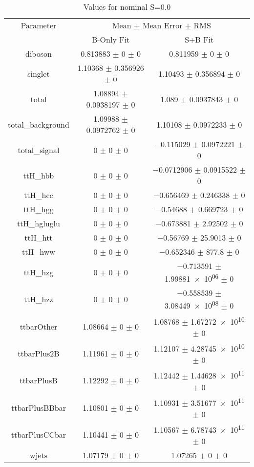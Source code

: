 \begin{table}
\centering
\caption{Values for nominal S=0.0}
\begin{tabular}{ccc}
\toprule
Parameter & \multicolumn{2}{c}{Mean $\pm$ Mean Error $\pm$ RMS}\\
 & B-Only Fit & S+B Fit\\
\midrule
diboson & \num{0.813883} $\pm$ \num{0} $\pm$ \num{0} & \num{0.811959} $\pm$ \num{0} $\pm$ \num{0}\\
singlet & \num{1.10368} $\pm$ \num{0.356926} $\pm$ \num{0} & \num{1.10493} $\pm$ \num{0.356894} $\pm$ \num{0}\\
total & \num{1.08894} $\pm$ \num{0.0938197} $\pm$ \num{0} & \num{1.089} $\pm$ \num{0.0937843} $\pm$ \num{0}\\
total\_background & \num{1.09988} $\pm$ \num{0.0972762} $\pm$ \num{0} & \num{1.10108} $\pm$ \num{0.0972233} $\pm$ \num{0}\\
total\_signal & \num{0} $\pm$ \num{0} $\pm$ \num{0} & \num{-0.115029} $\pm$ \num{0.0972221} $\pm$ \num{0}\\
ttH\_hbb & \num{0} $\pm$ \num{0} $\pm$ \num{0} & \num{-0.0712906} $\pm$ \num{0.0915522} $\pm$ \num{0}\\
ttH\_hcc & \num{0} $\pm$ \num{0} $\pm$ \num{0} & \num{-0.656469} $\pm$ \num{0.246338} $\pm$ \num{0}\\
ttH\_hgg & \num{0} $\pm$ \num{0} $\pm$ \num{0} & \num{-0.54688} $\pm$ \num{0.669723} $\pm$ \num{0}\\
ttH\_hgluglu & \num{0} $\pm$ \num{0} $\pm$ \num{0} & \num{-0.673881} $\pm$ \num{2.92502} $\pm$ \num{0}\\
ttH\_htt & \num{0} $\pm$ \num{0} $\pm$ \num{0} & \num{-0.56769} $\pm$ \num{25.9013} $\pm$ \num{0}\\
ttH\_hww & \num{0} $\pm$ \num{0} $\pm$ \num{0} & \num{-0.652346} $\pm$ \num{877.8} $\pm$ \num{0}\\
ttH\_hzg & \num{0} $\pm$ \num{0} $\pm$ \num{0} & \num{-0.713591} $\pm$ \num{1.99881e+06} $\pm$ \num{0}\\
ttH\_hzz & \num{0} $\pm$ \num{0} $\pm$ \num{0} & \num{-0.558539} $\pm$ \num{3.08449e+08} $\pm$ \num{0}\\
ttbarOther & \num{1.08664} $\pm$ \num{0} $\pm$ \num{0} & \num{1.08768} $\pm$ \num{1.67272e+10} $\pm$ \num{0}\\
ttbarPlus2B & \num{1.11961} $\pm$ \num{0} $\pm$ \num{0} & \num{1.12107} $\pm$ \num{4.28745e+10} $\pm$ \num{0}\\
ttbarPlusB & \num{1.12292} $\pm$ \num{0} $\pm$ \num{0} & \num{1.12442} $\pm$ \num{1.44628e+11} $\pm$ \num{0}\\
ttbarPlusBBbar & \num{1.10801} $\pm$ \num{0} $\pm$ \num{0} & \num{1.10931} $\pm$ \num{3.51677e+11} $\pm$ \num{0}\\
ttbarPlusCCbar & \num{1.10441} $\pm$ \num{0} $\pm$ \num{0} & \num{1.10567} $\pm$ \num{6.78743e+11} $\pm$ \num{0}\\
wjets & \num{1.07179} $\pm$ \num{0} $\pm$ \num{0} & \num{1.07265} $\pm$ \num{0} $\pm$ \num{0}\\
\bottomrule
\end{tabular}
\end{table}